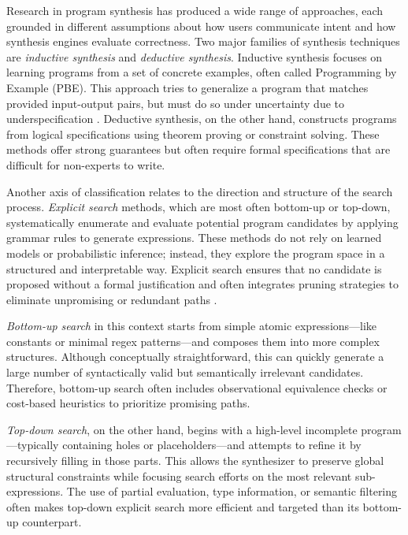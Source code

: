 \vspace{-0.4em}

\indent\indent Research in program synthesis has produced a wide range of approaches, each grounded in different assumptions about how users communicate intent and how synthesis engines evaluate correctness. Two major families of synthesis techniques are \textit{inductive synthesis} and \textit{deductive synthesis}. Inductive synthesis focuses on learning programs from a set of concrete examples, often called Programming by Example (PBE). This approach tries to generalize a program that matches provided input-output pairs, but must do so under uncertainty due to underspecification \cite{winston_1970}\cite{kitzelmann_2010_inductive}. Deductive synthesis, on the other hand, constructs programs from logical specifications using theorem proving or constraint solving. These methods offer strong guarantees but often require formal specifications that are difficult for non-experts to write.

\indent\indent Another axis of classification relates to the direction and structure of the search process. \textit{Explicit search} methods, which are most often bottom-up or top-down, systematically enumerate and evaluate potential program candidates by applying grammar rules to generate expressions. These methods do not rely on learned models or probabilistic inference; instead, they explore the program space in a structured and interpretable way. Explicit search ensures that no candidate is proposed without a formal justification and often integrates pruning strategies to eliminate unpromising or redundant paths \cite{solarlezama_2023_introduction}.

\indent\indent \textit{Bottom-up search} in this context starts from simple atomic expressions—like constants or minimal regex patterns—and composes them into more complex structures. Although conceptually straightforward, this can quickly generate a large number of syntactically valid but semantically irrelevant candidates. Therefore, bottom-up search often includes observational equivalence checks or cost-based heuristics to prioritize promising paths.

\indent\indent \textit{Top-down search}, on the other hand, begins with a high-level incomplete program—typically containing holes or placeholders—and attempts to refine it by recursively filling in those parts. This allows the synthesizer to preserve global structural constraints while focusing search efforts on the most relevant sub-expressions. The use of partial evaluation, type information, or semantic filtering often makes top-down explicit search more efficient and targeted than its bottom-up counterpart.

